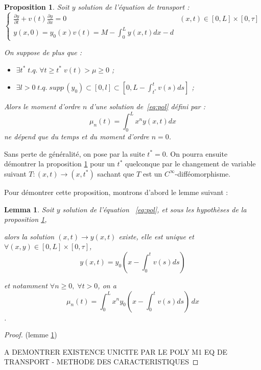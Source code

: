 \documentclass[a4paper]{article}
\newtheorem{lemma}[theorem]{Lemma}
\newtheorem{prop}{Proposition}[section]
\theoremstyle{definition}
\theoremstyle{remark}
\newcommand{\dep}{d}
\begin{document}
\begin{prop}
	\label{pol-moment}
	Soit $y$ solution de l'équation de transport :
	\begin{equation}
		\label{eq:pol}
		\begin{cases}
			\displaystyle \frac{\partial y}{\partial t}+ v(t) \frac{\partial y} {\partial x}  = 0 & (x,t) \in [0,L] \times [0, \tau] \\
             y(x,0) = y_{0} (x) 
			 v(t) = M - \int_0^L y(x,t)dx - \dep
		\end{cases}
	\end{equation}
	
	On suppose de plus que :
	\begin{itemize}
		\item $\exists t^* \; t.q. \; \forall t \geq t^* \; v(t) > \mu \geq 0$ ;
		\item $\exists l>0 \; t.q. \; supp \, (y_{0}) \subset [0,l]\subset [0,L-\int_{t^*}^t v(s)ds]$ ; 
	\end{itemize}
	
	Alors le moment d'ordre $n$ d'une solution de~\eqref{eq:pol} défini par :
	\[\mu_n (t) = \int_0^L x^n y(x,t) dx \]
	ne dépend que du temps et du moment d'ordre $n=0$.
\end{prop}

Sans perte de généralité, on pose par la suite $t^* = 0$. On pourra ensuite démontrer la proposition \ref{pol-moment} pour un $t^*$ quelconque par le changement de variable suivant $T: (x,t) \to (x,t^*)$ sachant que $T$ est un $C^\infty$-difféomorphisme.

Pour démontrer cette proposition, montrons d'abord le lemme suivant :

\begin{lemma}
	\label{pol-sol}
	Soit $y$ solution de l'équation ~\eqref{eq:pol}, et sous les hypothèses de la proposition \ref{pol-moment}, 
	
	alors la solution $(x,t) \to y(x,t)$ existe, elle est unique et $\forall (x,y) \in [0,L] \times [0, \tau]$, 
	\[y(x,t) = y_0(x-\int_{0}^t v(s)ds) \]
	
	et notamment $\forall n \geq 0, \; \forall t>0$, on a 
	\[\mu_n(t) = \int_0^L x^n y_0(x-\int_{0}^t v(s)ds) \, dx \].

\end{lemma}

\begin{proof}
	(lemme \ref{pol-sol})
	
	A DEMONTRER EXISTENCE UNICITE PAR LE POLY M1 EQ DE TRANSPORT - METHODE DES CARACTERISTIQUES
\end{proof}
\end{document}
